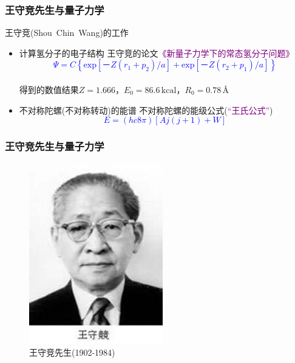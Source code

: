 {\frame
{
	\frametitle{王守竞先生与量子力学}
	王守竞(\textrm{Shou~Chin~Wang})的工作
	\begin{itemize}
		\item 计算氢分子的电子结构
			\vskip 2.5pt
			王守竞的论文\textcolor{purple}{《新量子力学下的常态氢分子问题》}%
	\textcolor{blue}{
	\begin{displaymath}
		\Psi=C\left\{ \mathrm{exp}[－Z(r_1+ p_2)/a]+\mathrm{exp}[－Z( r_2+ p_1)/a] \right\}
	\end{displaymath}}
	{\fontsize{7.2pt}{6.5pt}}\\
	得到的数值结果$Z=1.666$，$E_0=86.6\,\mathrm{kcal}$，$R_0=0.78$\,\textrm{\AA}
		\item 不对称陀螺(不对称转动)的能谱%
			\vskip 2.5pt
			不对称陀螺的能级公式(\textcolor{purple}{“王氏公式”})
	\textcolor{blue}{
	\begin{displaymath}
		E= (hc8\pi)[Aj(j+1)+W]
	\end{displaymath}}
	\end{itemize}
}

\frame
{
	\frametitle{王守竞先生与量子力学}
\begin{figure}[h!]
\centering
\vspace{-10.5pt}
\includegraphics[height=0.66\textwidth,width=0.52\textwidth,viewport=0 0 270 350,clip]{Figures/Wang_Shoujing.jpg}
\caption{王守竞先生(1902-1984)}
\label{Wang_Shoujing}
\end{figure}
}

}
